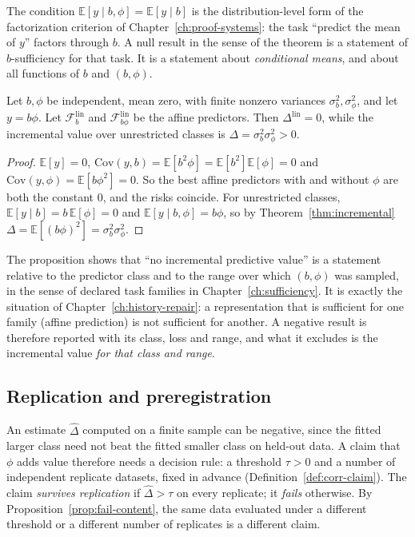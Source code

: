 The condition $\mathbb E[y\mid b,\phi]=\mathbb E[y\mid b]$ is the distribution-level form of the factorization criterion of Chapter~\ref{ch:proof-systems}: the task ``predict the mean of $y$'' factors through $b$. A null result in the sense of the theorem is a statement of $b$-sufficiency for that task. It is a statement about \emph{conditional means}, and about all functions of $b$ and $(b,\phi)$.

\begin{proposition}
\label{prop:restricted-null}
Let $b,\phi$ be independent, mean zero, with finite nonzero variances $\sigma_b^2,\sigma_\phi^2$, and let $y=b\phi$. Let $\mathcal F_b^{\mathrm{lin}}$ and $\mathcal F_{b\phi}^{\mathrm{lin}}$ be the affine predictors. Then $\Delta^{\mathrm{lin}}=0$, while the incremental value over unrestricted classes is $\Delta=\sigma_b^2\sigma_\phi^2>0$.
\end{proposition}

\begin{proof}
$\mathbb E[y]=0$, $\mathrm{Cov}(y,b)=\mathbb E[b^2\phi]=\mathbb E[b^2]\mathbb E[\phi]=0$ and $\mathrm{Cov}(y,\phi)=\mathbb E[b\phi^2]=0$. So the best affine predictors with and without $\phi$ are both the constant $0$, and the risks coincide. For unrestricted classes, $\mathbb E[y\mid b]=b\,\mathbb E[\phi]=0$ and $\mathbb E[y\mid b,\phi]=b\phi$, so by Theorem~\ref{thm:incremental} $\Delta=\mathbb E[(b\phi)^2]=\sigma_b^2\sigma_\phi^2$.
\end{proof}

The proposition shows that ``no incremental predictive value'' is a statement relative to the predictor class and to the range over which $(b,\phi)$ was sampled, in the sense of declared task families in Chapter~\ref{ch:sufficiency}. It is exactly the situation of Chapter~\ref{ch:history-repair}: a representation that is sufficient for one family (affine prediction) is not sufficient for another. A negative result is therefore reported with its class, loss and range, and what it excludes is the incremental value \emph{for that class and range}.

\subsection*{Replication and preregistration}

An estimate $\widehat\Delta$ computed on a finite sample can be negative, since the fitted larger class need not beat the fitted smaller class on held-out data. A claim that $\phi$ adds value therefore needs a decision rule: a threshold $\tau>0$ and a number of independent replicate datasets, fixed in advance (Definition~\ref{def:corr-claim}). The claim \emph{survives replication} if $\widehat\Delta>\tau$ on every replicate; it \emph{fails} otherwise. By Proposition~\ref{prop:fail-content}, the same data evaluated under a different threshold or a different number of replicates is a different claim.

